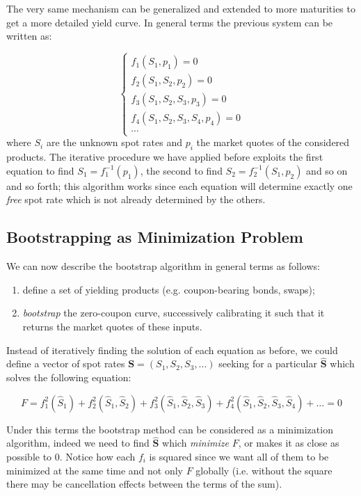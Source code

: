 The very same mechanism can be generalized and extended to more maturities to get a more detailed yield curve. In general terms the previous system can be written as:

\begin{equation}
\begin{cases}
f_1(S_1, p_1) = 0 \\
f_2(S_1, S_2, p_2) = 0 \\
f_3(S_1, S_2, S_3, p_3) = 0 \\
f_4(S_1, S_2, S_3, S_4, p_4) = 0 \\
\cdots
\end{cases}
\end{equation}
where $S_i$ are the unknown spot rates and $p_i$ the market quotes of the considered products. The iterative procedure we have applied before exploits the first equation to find $S_1 = f_1^{-1}(p_1)$, the second to find $S_2 = f_2^{-1}(S_1, p_2)$ and so on and so forth; this algorithm works since each equation will determine exactly one \emph{free} spot rate which is not already determined by the others.

\subsection{Bootstrapping as Minimization Problem}
We can now describe the bootstrap algorithm in general terms as follows:
\begin{enumerate}
\item define a set of yielding products (e.g. coupon-bearing bonds, swaps);
\item \emph{bootstrap} the zero-coupon curve, successively calibrating it such that it returns the market quotes of these inputs.
\end{enumerate}

Instead of iteratively finding the solution of each equation as before, we could define a vector of spot rates $\mathbf{S} = (S_1, S_2, S_3, \ldots)$ seeking for a particular $\mathbf{\hat{S}}$ which solves the following equation:

\begin{equation}
F = f_1^2(\hat{S}_1) + f_2^2(\hat{S}_1, \hat{S}_2) + f_3^2(\hat{S}_1, \hat{S}_2, \hat{S}_3) + f_4^2(\hat{S}_1, \hat{S}_2, \hat{S}_3, \hat{S}_4) + \ldots = 0
\end{equation}

Under this terms the bootstrap method can be considered as a minimization algorithm, indeed we need to find $\mathbf{\hat{S}}$ which \emph{minimize} $F$, or makes it as close as possible to 0.
Notice how each \(f_i\) is squared since we want all of them to be minimized at the same time and not only \(F\) globally (i.e. without the square there may be cancellation effects between the terms of the sum).

